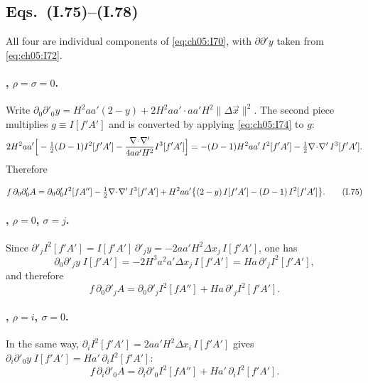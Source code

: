 \subsection[Eqs. (I.75)--(I.78)]{Eqs.~(I.75)--(I.78) \tD}

All four are individual components of \eqref{eq:ch05:I70}, with $\partial\partial'y$ taken from \eqref{eq:ch05:I72}.

\paragraph{, $\rho=\sigma=0$.}
Write $\partial_0\partial'_0y=H^2aa'(2-y)+2H^2aa'\cdot aa'H^2\|\Delta\vec x\|^2$.
The second piece multiplies $g\equiv I[f'A']$ and is converted by applying \eqref{eq:ch05:I74} to $g$:
\begin{equation*}
2H^2aa'\Big[-\tfrac12(D-1)I^2[f'A']-\frac{\nabla\!\cdot\!\nabla'}{4aa'H^2}I^3[f'A']\Big]=-(D-1)H^2aa'\,I^2[f'A']-\tfrac12\nabla\!\cdot\!\nabla'\,I^3[f'A'].
\end{equation*}
Therefore
\begin{resultbox}
\begin{equation}
f\,\partial_0\partial'_0A=\partial_0\partial'_0I^2[fA'']-\tfrac12\nabla\!\cdot\!\nabla'\,I^3[f'A']+H^2aa'\big\{(2-y)\,I[f'A']-(D-1)\,I^2[f'A']\big\}.
\tag{I.75}\label{eq:ch05:I75}
\end{equation}
\end{resultbox}

\paragraph{, $\rho=0$, $\sigma=j$.}
Since $\partial'_jI^2[f'A']=I[f'A']\,\partial'_jy=-2aa'H^2\Delta x_j\,I[f'A']$, one has
\begin{equation*}
\partial_0\partial'_jy\;I[f'A']=-2H^3a^2a'\Delta x_j\,I[f'A']=Ha\,\partial'_jI^2[f'A'],
\end{equation*}
and therefore
\begin{equation}
f\,\partial_0\partial'_jA=\partial_0\partial'_jI^2[fA'']+Ha\,\partial'_jI^2[f'A'] .
\tag{I.76}\label{eq:ch05:I76}
\end{equation}

\paragraph{, $\rho=i$, $\sigma=0$.}
In the same way, $\partial_iI^2[f'A']=2aa'H^2\Delta x_i\,I[f'A']$ gives $\partial_i\partial'_0y\;I[f'A']=Ha'\,\partial_iI^2[f'A']$:
\begin{equation}
f\,\partial_i\partial'_0A=\partial_i\partial'_0I^2[fA'']+Ha'\,\partial_iI^2[f'A'] .
\tag{I.77}\label{eq:ch05:I77}
\end{equation}

